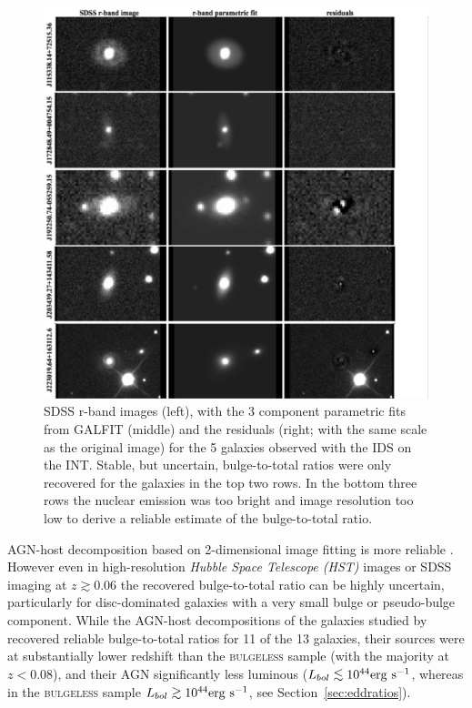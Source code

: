 {\begin{figure}
\centering
\includegraphics[width=\textwidth]{agn/galfit_residuals.pdf}
\caption[Parametric fits and residuals for the 5 galaxies observed at the INT]{SDSS r-band images (left), with the 3 component parametric fits from GALFIT (middle) and the residuals (right; with the same scale as the original image) for the 5 galaxies observed with the IDS on the INT. Stable, but uncertain, bulge-to-total ratios were only recovered for the galaxies in the top two rows. In the bottom three rows the nuclear emission was too bright and image resolution too low to derive a reliable estimate of the bulge-to-total ratio.
}
\label{fig:galfit}
\end{figure}

AGN-host decomposition based on 2-dimensional image fitting \citep[e.g.,][]{simard98,peng02,peng10b} is more reliable \citep[e.g.][]{mclure99,urry00,mclure01,sanchez04,pierce07,gabor09,Simmons11,Simmons13,koss11}. However even in high-resolution \emph{Hubble Space Telescope (HST)} images \citep{simmons08} or SDSS imaging at $z \gtrsim 0.06$ \citep[][]{koss11,Simmons13} the recovered bulge-to-total ratio can be highly uncertain, particularly for disc-dominated galaxies with a very small bulge or pseudo-bulge \citep{kormendy04} component. While the AGN-host decompositions of the galaxies studied by \citet{Simmons13} recovered reliable bulge-to-total ratios for 11 of the 13 galaxies, their sources were at substantially lower redshift than the \textsc{bulgeless} sample (with the majority at $z < 0.08$), and their AGN significantly less luminous ($L_{bol} \lesssim 10^{44} \rm{erg}~\rm{s}^{-1}$, whereas in the \textsc{bulgeless} sample $L_{bol} \gtrsim 10^{44} \rm{erg}~\rm{s}^{-1}$, see Section~\ref{sec:eddratios}). 

}
